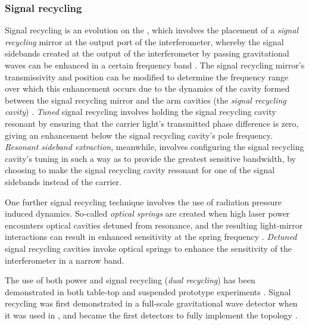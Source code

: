 \subsubsection{\label{sec:signal-recycling}Signal recycling}
Signal recycling is an evolution on the \PRFPMI{}, which involves the placement of a \emph{signal recycling} mirror at the output port of the interferometer, whereby the signal sidebands created at the output of the interferometer by passing gravitational waves can be enhanced in a certain frequency band \cite{Meers1988}. The signal recycling mirror's transmissivity and position can be modified to determine the frequency range over which this enhancement occurs due to the dynamics of the cavity formed between the signal recycling mirror and the arm cavities (the \emph{signal recycling cavity}) \cite{Buonanno2001}. \emph{Tuned} signal recycling involves holding the signal recycling cavity resonant by ensuring that the carrier light's transmitted phase difference is zero, giving an enhancement below the signal recycling cavity's pole frequency. \emph{Resonant sideband extraction}, meanwhile, involves configuring the signal recycling cavity's tuning in such a way as to provide the greatest sensitive bandwidth, by choosing to make the signal recycling cavity resonant for one of the signal sidebands instead of the carrier.

One further signal recycling technique involves the use of radiation pressure induced dynamics. So-called \emph{optical springs} are created when high laser power encounters optical cavities detuned from resonance, and the resulting light-mirror interactions can result in enhanced sensitivity at the spring frequency \cite{Buonanno2002}. \emph{Detuned} signal recycling cavities invoke optical springs to enhance the sensitivity of the interferometer in a narrow band.

The use of both power and signal recycling (\emph{dual recycling}) has been demonstrated in both table-top and suspended prototype experiments \cite{Strain1991, Heinzel1998, Freise2000}. Signal recycling was first demonstrated in a full-scale gravitational wave detector when it was used in \GEO{} \cite{Heinzel2002, Grote2004}, and \ALIGO{} became the first detectors to fully implement the \DRFPMI{} topology .


